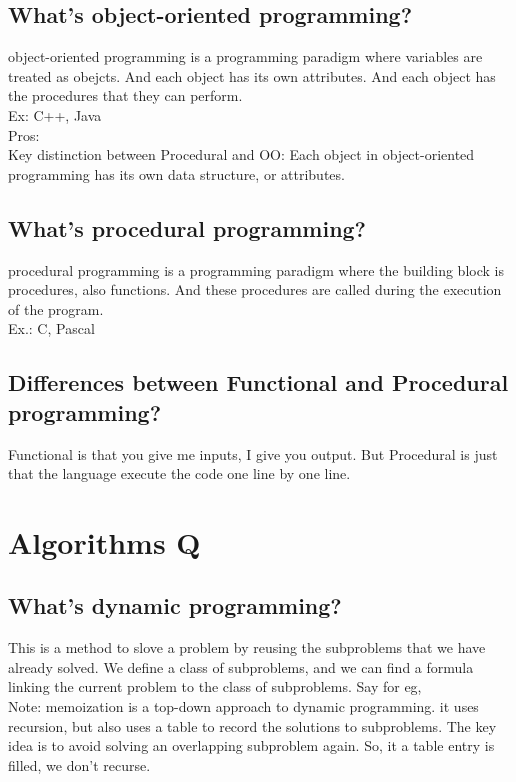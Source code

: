 \documentclass[12pt, landscape]{article}
\begin{document}
\begin{multicols}{2}
\subsection{What's object-oriented programming?}
object-oriented programming is a programming paradigm where variables are treated as obejcts. And each object has its own attributes. And each object has the procedures that they can perform. \\

Ex: C++, Java\\

Pros: \\

Key distinction between Procedural and OO: Each object in object-oriented programming has its own data structure, or attributes.

\subsection{What's procedural  programming?}
procedural programming is a programming paradigm where the building block is procedures, also functions. And these procedures are called during the execution of the program.\\

Ex.: C, Pascal
\subsection{Differences between Functional and Procedural programming?}
Functional is that you give me inputs, I give you output. But Procedural is just that the language execute the code one line by one line. 



\section{Algorithms Q}

\subsection{What's dynamic programming?}
This is a method to slove a problem by reusing the subproblems that we have already solved. We define a class of subproblems, and we can find a formula linking the current problem to the class of subproblems. Say for eg, \\

Note: memoization is a top-down approach to dynamic programming. it uses recursion, but also uses a table to record the solutions to subproblems. The key idea is to avoid solving an overlapping subproblem again. So, it a table entry is filled, we don't recurse.


\end{multicols}
\end{document}
